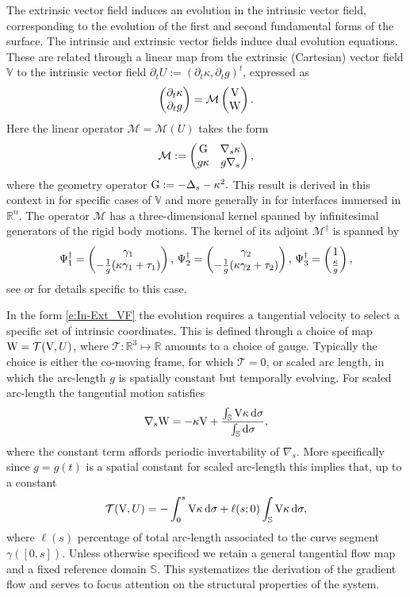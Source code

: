 \documentclass[11pt]{amsart}
\theoremstyle{plain}
\newcommand{\beq}{\begin{equation}}
\newcommand{\eeq}{\end{equation}}
\def\cM{{\mathcal M}}
\def\cT{{\mathcal T}}
\def\mbbR{\mathbb{R}}
\def\mbbS{\mathbb{S}}
\def\mbbV{\mathbb{V}}
\def\mrG{\textrm G}
\def\mrV{\textrm V}
\def\mrW{\textrm W}
\def\mrd{\textrm d}
\def\bpm{\begin{pmatrix}}
\def\epm{\end{pmatrix}}
\def\rmd{\mathrm d}
\numberwithin{equation}{section}
\theoremstyle{plain}
\begin{document}
The extrinsic vector field induces an evolution in the intrinsic vector field, corresponding to the evolution of the first and second fundamental forms of the surface. The intrinsic and extrinsic vector fields induce dual evolution equations.  These are related through a linear map from the extrinsic (Cartesian) vector field $\mbbV$ to the intrinsic vector field $\partial_t U:=(\partial_t \kappa, \partial_t g)^t$, expressed as
\beq\label{e:In-Ext_VF} \begin{pmatrix}
    \partial_t \kappa \cr \partial_t g 
\end{pmatrix} =
\cM 
\begin{pmatrix}
 \mrV \cr \mrW   
\end{pmatrix}.
\eeq
Here the linear operator $\cM=\cM(U)$ takes the form
\beq \label{e:cM_def}
\cM:= \begin{pmatrix} \mrG & \nabla_s \kappa \cr
  g\kappa & g\nabla_s
 \end{pmatrix},
\eeq
where the geometry operator $\mrG:=-\Delta_s -\kappa^2.$ This result is derived in this context in \cite{Pismen_06} for specific cases of $\mbbV$ and more generally in \cite{Barrett_20} for interfaces immersed in $\mbbR^n$. The operator $\cM$ has a three-dimensional kernel spanned by infinitesimal generators of the rigid body motions. The kernel of its adjoint $\cM^\dag$ is spanned by 
\beq\label{e:Psidag}
\Psi_1^\dag=\bpm \gamma_1\cr -\frac{1}{g}(\kappa \gamma_1 +\tau_1)\epm,\, 
\Psi_2^\dag= \bpm \gamma_2\cr -\frac{1}{g}(\kappa \gamma_2 +\tau_2)\epm,\,
\Psi_3^\dag=
\bpm 1 \cr \frac{\kappa}{g}\epm,
\eeq
see \cite{NPW_25} or \cite{Pwu_26} for details specific to this case.

In the form \eqref{e:In-Ext_VF} the evolution requires a tangential velocity to select a specific set of intrinsic coordinates. This is defined through a choice of map $\mrW=\cT(\mrV,U)$, where $\cT:\mbbR^3\mapsto\mbbR$ amounts to a choice of gauge. Typically the choice is either the co-moving frame, for which $\cT=0$, or scaled arc length, in which the arc-length $g$ is spatially constant but temporally evolving. For scaled arc-length the tangential motion satisfies
$$ \nabla_s \mrW=-\kappa\mrV +\frac{\int_\mbbS \mrV\kappa\,\rmd\sigma}{\int_\mbbS \rmd \sigma},$$
where the constant term affords periodic invertability of $\nabla_s.$ More specifically since $g=g(t)$ is a spatial constant for scaled arc-length this implies that, up to a constant
\beq\label{e:SAL}
\cT(\mrV,U)=-\int_0^s\mrV\kappa\,\mrd \sigma + \ell(s;0) \int_\mbbS \mrV\kappa\,\mrd\sigma,
\eeq
where $\ell(s)$ percentage of total   arc-length associated to the curve segment  $\gamma([0,s]).$
Unless otherwise specificed we retain a general tangential flow map and a fixed reference domain $\mbbS$. This systematizes the derivation of the gradient flow and serves to focus attention on the structural properties of the system. 
\end{document}
